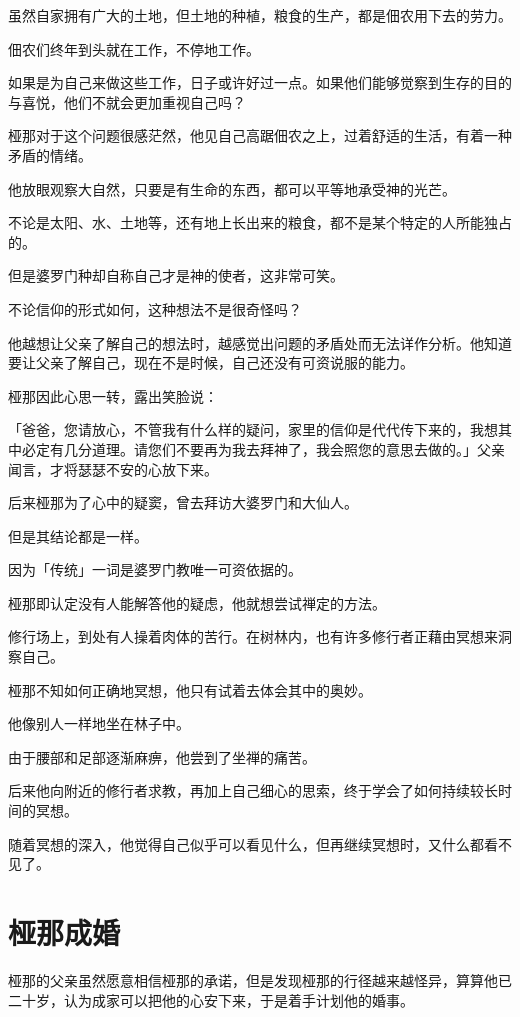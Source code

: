 \documentclass[twoside,openany]{book}
\begin{document}
虽然自家拥有广大的土地，但土地的种植，粮食的生产，都是佃农用下去的劳力。

佃农们终年到头就在工作，不停地工作。

如果是为自己来做这些工作，日子或许好过一点。如果他们能够觉察到生存的目的与喜悦，他们不就会更加重视自己吗？

桠那对于这个问题很感茫然，他见自己高踞佃农之上，过着舒适的生活，有着一种矛盾的情绪。

他放眼观察大自然，只要是有生命的东西，都可以平等地承受神的光芒。

不论是太阳、水、土地等，还有地上长出来的粮食，都不是某个特定的人所能独占的。

但是婆罗门种却自称自己才是神的使者，这非常可笑。

不论信仰的形式如何，这种想法不是很奇怪吗？

他越想让父亲了解自己的想法时，越感觉出问题的矛盾处而无法详作分析。他知道要让父亲了解自己，现在不是时候，自己还没有可资说服的能力。

桠那因此心思一转，露出笑脸说：

「爸爸，您请放心，不管我有什么样的疑问，家里的信仰是代代传下来的，我想其中必定有几分道理。请您们不要再为我去拜神了，我会照您的意思去做的。」父亲闻言，才将瑟瑟不安的心放下来。

后来桠那为了心中的疑窦，曾去拜访大婆罗门和大仙人。

但是其结论都是一样。

因为「传统」一词是婆罗门教唯一可资依据的。

桠那即认定没有人能解答他的疑虑，他就想尝试禅定的方法。

修行场上，到处有人操着肉体的苦行。在树林内，也有许多修行者正藉由冥想来洞察自己。

桠那不知如何正确地冥想，他只有试着去体会其中的奥妙。

他像别人一样地坐在林子中。

由于腰部和足部逐渐麻痹，他尝到了坐禅的痛苦。

后来他向附近的修行者求教，再加上自己细心的思索，终于学会了如何持续较长时间的冥想。

随着冥想的深入，他觉得自己似乎可以看见什么，但再继续冥想时，又什么都看不见了。

\section{桠那成婚}\label{sec4.2}

桠那的父亲虽然愿意相信桠那的承诺，但是发现桠那的行径越来越怪异，算算他已二十岁，认为成家可以把他的心安下来，于是着手计划他的婚事。
\end{document}
